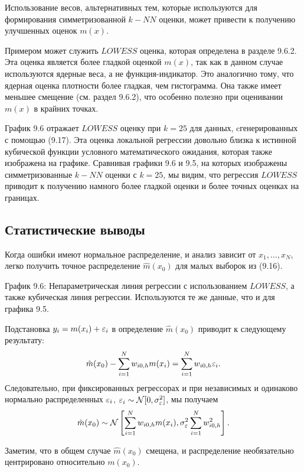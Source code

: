 Использование весов, альтернативных тем, которые используются для формирования симметризованной $k - NN$ оценки,  может привести к получению улучшенных оценок $m(x)$.

Примером может служить $LOWESS$ оценка, которая определена в разделе 9.6.2. Эта оценка является более гладкой оценкой $m(x)$, так как в данном случае используются ядерные веса, а не функция-индикатор. Это аналогично тому, что ядерная оценка плотности более гладкая, чем гистограмма. Она также имеет меньшее смещение (см. раздел 9.6.2), что особенно полезно при оценивании $m(x)$ в крайних точках.

График 9.6 отражает $LOWESS$ оценку при $k = 25$ для данных, cгенерированных с помощью (9.17). Эта оценка локальной регрессии довольно близка к истинной кубической функции условного математического ожидания, которая также изображена на графике. Сравнивая графики 9.6 и 9.5, на которых изображены симметризованные $k - NN$ оценки с $k = 25$, мы видим, что регрессия $LOWESS$ приводит к получению намного более гладкой оценки и более точных оценках на границах.

\subsection{Статистические выводы}

Когда ошибки имеют нормальное распределение, и анализ зависит от $x_1, \dots, x_N$, легко получить точное распределение $\hat{m}(x_0)$ для малых выборок из (9.16).

\vspace{5cm}

График 9.6: Непараметрическая линия регрессии с использованием $LOWESS$, а также кубическая линия регрессии. Используются те же данные, что и для графика 9.5.

Подстановка $y_i = m(x_i) + \varepsilon_i$ в определение $\hat{m}(x_0)$ приводит к следующему результату:
\[
\hat{m}(x_0) - \sum_{i=1}^N w_{i0,h} m(x_i) =  \sum_{i=1}^N w_{i0,h}\varepsilon_i.
\]
Следовательно, при фиксированных регрессорах и при независимых и одинаково нормально распределенных $\varepsilon_i$,  $\varepsilon_i\sim \mathcal{N}[0, \sigma_{\varepsilon}^2]$, мы получаем
\begin{equation}
\hat{m}(x_0) \sim \mathcal{N}\left[\sum_{i=1}^N w_{i0,h} m(x_i), \sigma_{\varepsilon}^2 \sum_{i=1}^N w_{i0,h}^2\right].
\end{equation}

Заметим, что в общем случае $\hat{m}(x_0)$ смещена, и распределение необязательно центрировано относительно $m(x_0)$.

